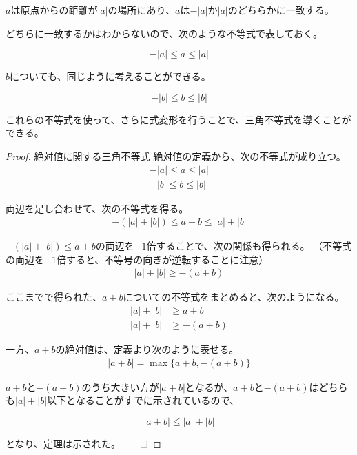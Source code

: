 \documentclass[../../math-imaging]{subfiles}
\begin{document}
$a$は原点からの距離が$|a|$の場所にあり、$a$は$-|a|$か$|a|$のどちらかに一致する。

どちらに一致するかはわからないので、次のような不等式で表しておく。

\begin{equation}
  -|a| \leq a \leq |a|
\end{equation}

$b$についても、同じように考えることができる。

\begin{equation}
  -|b| \leq b \leq |b|
\end{equation}

これらの不等式を使って、さらに式変形を行うことで、三角不等式を導くことができる。

\begin{proof}{絶対値に関する三角不等式}
  絶対値の定義から、次の不等式が成り立つ。
  \begin{align}
    -|a| \leq a \leq |a| \\
    -|b| \leq b \leq |b|
  \end{align}

  両辺を足し合わせて、次の不等式を得る。
  \begin{align}
    -(|a| + |b|) \leq a + b \leq |a| + |b|
  \end{align}

  $-(|a| + |b|) \leq a + b$の両辺を$-1$倍することで、次の関係も得られる。
  （不等式の両辺を$-1$倍すると、不等号の向きが逆転することに注意）
  \begin{align}
    |a| + |b| \geq -(a + b)
  \end{align}

  ここまでで得られた、$a+b$についての不等式をまとめると、次のようになる。
  \begin{align}
    |a| + |b| & \geq a+b      \\
    |a| + |b| & \geq -(a + b)
  \end{align}

  一方、$a+b$の絶対値は、定義より次のように表せる。
  \begin{align}
    |a + b| = \max\{a + b, -(a + b)\}
  \end{align}

  $a+b$と$-(a+b)$のうち大きい方が$|a+b|$となるが、$a + b$と$-(a+b)$はどちらも$|a| + |b|$以下となることがすでに示されているので、

  \begin{equation}
    |a + b| \leq |a| + |b|
  \end{equation}

  となり、定理は示された。$\qed$
\end{proof}
\end{document}
